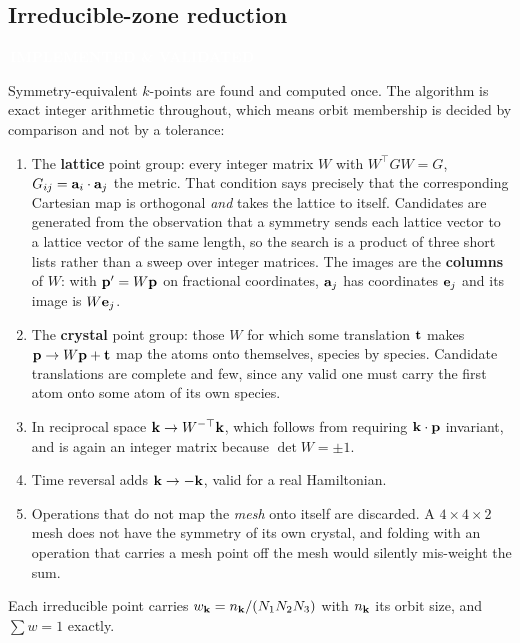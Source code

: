 \documentclass[11pt,a4paper]{article}
\newcommand{\badge}[2]{%
  \par\vspace{2pt}\noindent
  \colorbox{#1}{\textcolor{white}{\small\bfseries\,#2\,}}\par\vspace{4pt}}
\newcommand{\implemented}{\badge{okgreen}{IMPLEMENTED \& VALIDATED}}
\begin{document}
\subsection{Irreducible-zone reduction}
\label{sec:ibz}
\implemented

Symmetry-equivalent $k$-points are found and computed once. The algorithm is
exact integer arithmetic throughout, which means orbit membership is decided
by comparison and not by a tolerance:

\begin{enumerate}[itemsep=2pt]
  \item The \textbf{lattice} point group: every integer matrix $W$ with
        $W^{\!\top} G W = G$, $G_{ij} = \vb{a}_i\cdot\vb{a}_j$ the metric.
        That condition says precisely that the corresponding Cartesian map is
        orthogonal \emph{and} takes the lattice to itself. Candidates are
        generated from the observation that a symmetry sends each lattice
        vector to a lattice vector of the same length, so the search is a
        product of three short lists rather than a sweep over integer
        matrices. The images are the \textbf{columns} of $W$: with
        $\vb{p}' = W\vb{p}$ on fractional coordinates, $\vb{a}_j$ has
        coordinates $\vb{e}_j$ and its image is $W\vb{e}_j$.
  \item The \textbf{crystal} point group: those $W$ for which some translation
        $\vb{t}$ makes $\vb{p} \to W\vb{p} + \vb{t}$ map the atoms onto
        themselves, species by species. Candidate translations are complete
        and few, since any valid one must carry the first atom onto some atom
        of its own species.
  \item In reciprocal space $\vb{k} \to W^{-\top}\vb{k}$, which follows from
        requiring $\vb{k}\cdot\vb{p}$ invariant, and is again an integer
        matrix because $\det W = \pm 1$.
  \item Time reversal adds $\vb{k}\to-\vb{k}$, valid for a real Hamiltonian.
  \item Operations that do not map the \emph{mesh} onto itself are discarded.
        A $4\times4\times2$ mesh does not have the symmetry of its own
        crystal, and folding with an operation that carries a mesh point off
        the mesh would silently mis-weight the sum.
\end{enumerate}

\noindent
Each irreducible point carries $w_{\vb{k}} = n_{\vb{k}}/(N_1N_2N_3)$ with
$n_{\vb{k}}$ its orbit size, and $\sum w = 1$ exactly.
\end{document}
